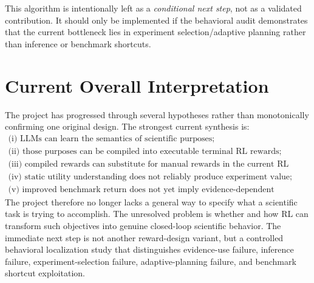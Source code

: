 \documentclass[11pt]{article}
\begin{document}
This algorithm is intentionally left as a \emph{conditional next step}, not as a validated contribution. It should only be implemented if the behavioral audit demonstrates that the current bottleneck lies in experiment selection/adaptive planning rather than inference or benchmark shortcuts.

\section{Current Overall Interpretation}
The project has progressed through several hypotheses rather than monotonically confirming one original design. The strongest current synthesis is:
\[
\boxed{
\begin{array}{l}
\text{(i) LLMs can learn the semantics of scientific purposes;}\\
\text{(ii) those purposes can be compiled into executable terminal RL rewards;}\\
\text{(iii) compiled rewards can substitute for manual rewards in the current RL pipeline;}\\
\text{(iv) static utility understanding does not reliably produce experiment value;}\\
\text{(v) improved benchmark return does not yet imply evidence-dependent experimentation.}
\end{array}}
\]
The project therefore no longer lacks a general way to specify what a scientific task is trying to accomplish. The unresolved problem is whether and how RL can transform such objectives into genuine closed-loop scientific behavior. The immediate next step is not another reward-design variant, but a controlled behavioral localization study that distinguishes evidence-use failure, inference failure, experiment-selection failure, adaptive-planning failure, and benchmark shortcut exploitation.
\end{document}
